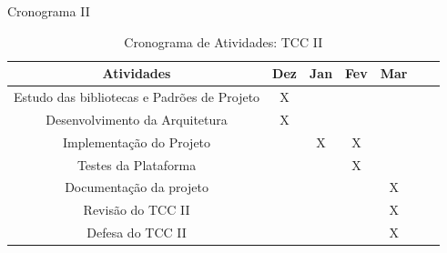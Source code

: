 \begin{frame}{Cronograma II}
	\begin{table}[h]
		\caption*{Cronograma de Atividades: TCC II}
		\centering
		\begin{tabular}{c c c c c c c} \hline
			\label{quad:cronograma-atividades}
			\textbf{Atividades}                         & \textbf{Dez} & \textbf{Jan} & \textbf{Fev} & \textbf{Mar} \\ \hline
			Estudo das bibliotecas e Padrões de Projeto & X            &              &              &              \\ \hline
			Desenvolvimento da Arquitetura              & X            &              &              &              \\ \hline
			Implementação do Projeto                    &              & X            & X            &              \\ \hline
			Testes da Plataforma                        &              &              & X            &              \\ \hline
			Documentação da projeto                     &              &              &              & X            \\ \hline
			Revisão do TCC II                           &              &              &              & X            \\ \hline
			Defesa do TCC II                            &              &              &              & X            \\ \hline
		\end{tabular}
	\end{table}
\end{frame}
